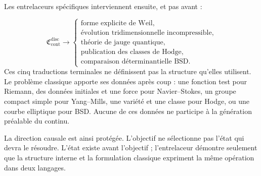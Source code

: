 Les entrelaceurs spécifiques interviennent ensuite, et pas avant :\par
\[
\mathfrak C_{\mathrm{cont}}^{\mathrm{disc}}
\longrightarrow
\begin{cases}
\text{forme explicite de Weil},\\
\text{évolution tridimensionnelle incompressible},\\
\text{théorie de jauge quantique},\\
\text{publication des classes de Hodge},\\
\text{comparaison déterminantielle BSD}.
\end{cases}
\]
Ces cinq traductions terminales ne définissent pas la structure qu’elles utilisent. Le problème classique apporte ses données après coup : une fonction test pour Riemann, des données initiales et une force pour Navier–Stokes, un groupe compact simple pour Yang–Mills, une variété et une classe pour Hodge, ou une courbe elliptique pour BSD. Aucune de ces données ne participe à la génération préalable du continu.\par
La direction causale est ainsi protégée. L’objectif ne sélectionne pas l’état qui devra le résoudre. L’état existe avant l’objectif ; l’entrelaceur démontre seulement que la structure interne et la formulation classique expriment la même opération dans deux langages.\par
{}
